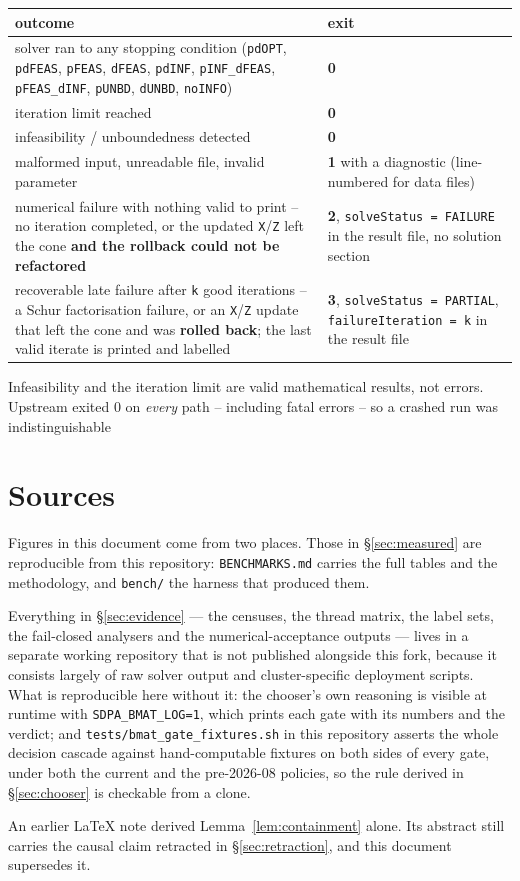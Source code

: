 \documentclass[11pt]{article}
\newcommand{\code}[1]{\texttt{#1}}
\begin{document}
\begingroup
\footnotesize
\begin{longtable}{@{}p{}p{}@{}}
\toprule
\textbf{outcome} & \textbf{exit} \\
\midrule
\endfirsthead
solver ran to any stopping condition (\code{pdOPT}, \code{pdFEAS}, \code{pFEAS}, \code{dFEAS}, \code{pdINF}, \code{pINF\_dFEAS}, \code{pFEAS\_dINF}, \code{pUNBD}, \code{dUNBD}, \code{noINFO}) & \textbf{0} \\
\midrule
iteration limit reached & \textbf{0} \\
\midrule
infeasibility / unboundedness detected & \textbf{0} \\
\midrule
malformed input, unreadable file, invalid parameter & \textbf{1} with a diagnostic (line-numbered for data files) \\
\midrule
numerical failure with nothing valid to print -- no iteration completed, or the updated \code{X}/\code{Z} left the cone \textbf{and the rollback could not be refactored} & \textbf{2}, \code{solveStatus = FAILURE} in the result file, no solution section \\
\midrule
recoverable late failure after \code{k} good iterations -- a Schur factorisation failure, or an \code{X}/\code{Z} update that left the cone and was \textbf{rolled back}; the last valid iterate is printed and labelled & \textbf{3}, \code{solveStatus = PARTIAL}, \code{failureIteration = k} in the result file \\
\midrule
\end{longtable}
\endgroup

Infeasibility and the iteration limit are valid mathematical results, not errors. Upstream
exited 0 on \emph{every} path -- including fatal errors -- so a crashed run was indistinguishable

\section{Sources}

Figures in this document come from two places. Those in \S\ref{sec:measured} are reproducible from this
repository: \code{BENCHMARKS.md} carries the full tables and the methodology, and
\code{bench/} the harness that produced them.

Everything in \S\ref{sec:evidence} --- the censuses, the thread matrix, the label sets, the fail-closed
analysers and the numerical-acceptance outputs --- lives in a separate working repository that is
not published alongside this fork, because it consists largely of raw solver output and
cluster-specific deployment scripts. What is reproducible here without it: the chooser's own
reasoning is visible at runtime with \code{SDPA\_BMAT\_LOG=1}, which prints each gate with its
numbers and the verdict; and \code{tests/bmat\_gate\_fixtures.sh} in this repository asserts the
whole decision cascade against hand-computable fixtures on both sides of every gate, under both
the current and the pre-2026-08 policies, so the rule derived in \S\ref{sec:chooser} is checkable from a clone.

An earlier LaTeX note derived Lemma~\ref{lem:containment} alone. Its abstract still carries the
causal claim retracted in \S\ref{sec:retraction}, and this document supersedes it.
\end{document}
